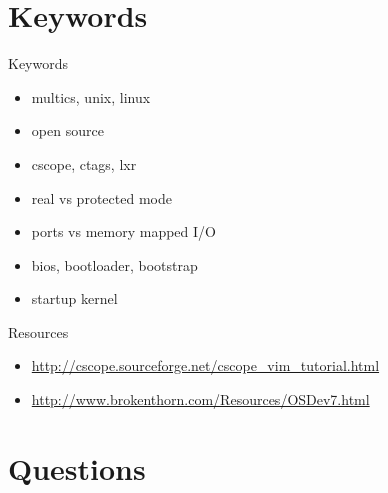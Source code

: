 \documentclass{workshop}
\begin{document}
\section{Keywords}

\begin{frame}{Keywords}
      \begin{itemize}
	\item multics, unix, linux
	\item open source
        \item cscope, ctags, lxr
        \item real vs protected mode
        \item ports vs memory mapped I/O
        \item bios, bootloader, bootstrap
        \item startup kernel
      \end{itemize}
\end{frame}

\begin{frame}{Resources}
  \begin{itemize}
    \item \url{http://cscope.sourceforge.net/cscope_vim_tutorial.html}
    \item \url{http://www.brokenthorn.com/Resources/OSDev7.html}
  \end{itemize}
\end{frame}

\section{Questions}
\end{document}
